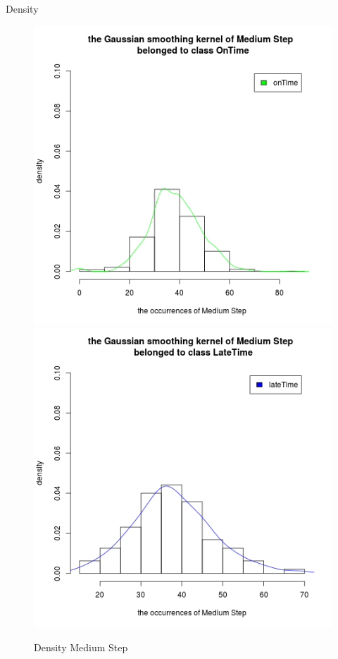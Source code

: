 \documentclass[a4paper, 13pt]{report}
\begin{document}
Density 
\FloatBarrier
\begin{figure}[!htb]
  \includegraphics[width=\linewidth]{DensityMediumStep_OnTime}
\endminipage
{}
  \includegraphics[width=\linewidth]{DensityMediumStep_LateTime}
\endminipage
\caption*{Density Medium Step}
\end{figure}
\end{document}
